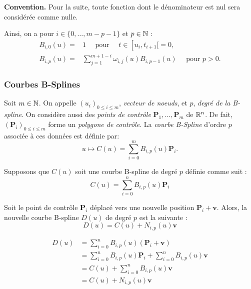 \begin{coder}
\textbf{Convention.  } Pour la suite, toute fonction dont le dénominateur est nul sera considérée comme nulle.
\end{coder}

\begin{definition}
    Ainsi, on a pour $i \in \{0, \ldots, m-p-1\}$ et $p \in \mathbb{N}$ :
    \begin{align*}
        B_{i, 0}(u)=&1 \quad \text { pour } \quad t \in\left[u_i, t_{i+1}[=0\text {, }\right.\\
        B_{i, p}(u)=&\sum_{j=1}^{m+1-i} \omega_{i, j}(u)B_{i, p-1}(u) \quad \text { pour } p>0.
    \end{align*}
\end{definition}

\subsubsection{Courbes B-Splines}

\begin{definition}
    Soit $m\in\mathbb{N}$. On appelle $(u_i)_{0 \leq i \leq m}$, \emph{vecteur de noeuds}, et $p$, \emph{degré de la B-spline}.
    On considère aussi des \emph{points de contrôle} $\mathbf{P}_1, \dots, \mathbf{P}_m$ de $\mathbb{R}^n$. De fait, $(\mathbf{P}_i)_{0 \leq i \leq m}$ forme un \emph{polygone de contrôle}.
    La \emph{courbe B-Spline} d'ordre $p$ associée à ces données est définie par:
    \begin{equation}
        u \longmapsto C(u)=\sum_{i=0}^{m} B_{i, p}(u)\mathbf{P}_i.
    \end{equation}
\end{definition}

\begin{propriete}
    Supposons que \( C(u) \) soit une courbe B-spline de degré \( p \) définie comme suit :
    \[
    C(u) = \sum_{i=0}^{n} B_{i,p}(u) \mathbf{P}_i
    \]
    
    Soit le point de contrôle \( \mathbf{P}_i \) déplacé vers une nouvelle position \( \mathbf{P}_i + \mathbf{v} \). Alors, la nouvelle courbe B-spline \( D(u) \) de degré \( p \) est la suivante \cite{pansu2004bsplines} :
    \begin{equation}
        D(u) = C(u) + N_{i,p}(u) \mathbf{v}
    \end{equation}
\end{propriete}
\begin{dem}
    \begin{align*}
        D(u) &= \sum_{i=0}^{n} B_{i,p}(u) (\mathbf{P}_i + \mathbf{v}) \\
        &= \sum_{i=0}^{n} B_{i,p}(u) \mathbf{P}_i + \sum_{i=0}^{n} B_{i,p}(u) \mathbf{v} \\
        &= C(u) + \sum_{i=0}^{n} B_{i,p}(u) \mathbf{v} \\
        &= C(u) + N_{i,p}(u) \mathbf{v}
    \end{align*}
\end{dem}

